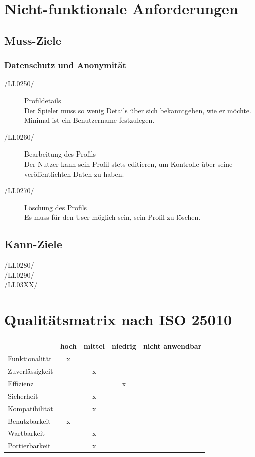 \documentclass[11pt,a4paper]{scrreprt}
\begin{document}
\chapter{Nicht-funktionale Anforderungen}
\section{Muss-Ziele}
\subsection{Datenschutz und Anonymität}
\begin{description}
\item[/LL0250/] Profildetails \\
Der Spieler muss so wenig Details über sich bekanntgeben, wie er möchte. Minimal ist ein Benutzername festzulegen.
\item[/LL0260/] Bearbeitung des Profils \\ 
Der Nutzer kann sein Profil stets editieren, um Kontrolle über seine veröffentlichten Daten zu haben.
\item[/LL0270/] Löschung des Profils \\ 
Es muss für den User möglich sein, sein Profil zu löschen.
\end{description}
\section{Kann-Ziele}
\begin{description}
\item[/LL0280/]
\item[/LL0290/]
\item[/LL03XX/]
\end{description}

\chapter{Qualitätsmatrix nach ISO 25010}
\begin{tabular}{|l|c|c|c|c|}
\hline
		& hoch & mittel & niedrig& nicht anwendbar\\
\hline
Funktionalität  &x              &              & 		&\\     
Zuverlässigkeit	&              & x             & 		&\\
Effizienz 		&              &              & x		&\\
Sicherheit  	&              & x             & 		&\\
Kompatibilität  &              &x              & 		&\\
Benutzbarkeit  	& x             &              & 		&\\
Wartbarkeit  	&              &x              & 		&\\
Portierbarkeit  &              &x              & 		&\\
\hline
\end{tabular}
\end{document}
